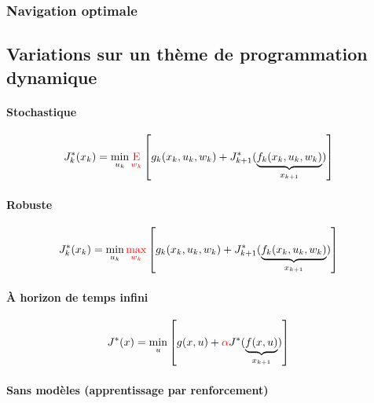 

\subsubsection{Navigation optimale}


\newpage
\subsection{Variations sur un thème de programmation dynamique}

\paragraph{Stochastique}

\begin{align}
J^*_k(x_k) = 
\operatornamewithlimits{min}\limits_{u_k}
{\color{red}
\operatornamewithlimits{E}\limits_{w_k}
}
&\left[
g_k(x_k , u_k , w_k ) + J^*_{k+1}( 
\underbrace{
f_k(x_k , u_k , w_k ) 
}_{x_{k+1}}
)
\right] 
\end{align} 

\paragraph{Robuste}

\begin{align}
J^*_k(x_k) = 
\operatornamewithlimits{min}\limits_{u_k}
{\color{red}
\operatornamewithlimits{max}\limits_{w_k}
}
&\left[
g_k(x_k , u_k , w_k ) + J^*_{k+1}( 
\underbrace{
f_k(x_k , u_k , w_k ) 
}_{x_{k+1}}
)
\right] 
\end{align} 

\paragraph{À horizon de temps infini}

\begin{align}
J^*(x) = 
\operatornamewithlimits{min}\limits_{u}
&\left[
g(x , u ) + {\color{red}\alpha} J^*( 
\underbrace{
f(x , u ) 
}_{x_{k+1}}
)
\right] 
\end{align} 

\paragraph{Sans modèles (apprentissage par renforcement)}

